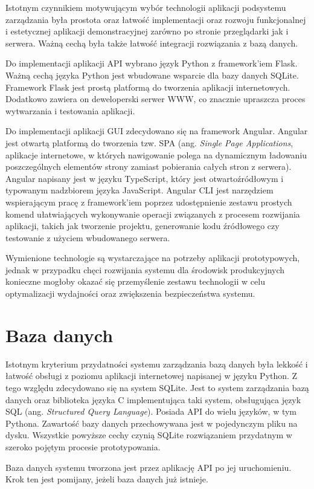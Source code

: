        	Istotnym czynnikiem motywującym wybór technologii aplikacji podsystemu zarządzania była prostota oraz łatwość implementacji oraz rozwoju funkcjonalnej i estetycznej aplikacji demonstracyjnej zarówno po stronie przeglądarki jak i serwera. Ważną cechą była także łatwość integracji rozwiązania z bazą danych. 

		Do implementacji aplikacji API wybrano język Python z framework'iem Flask. Ważną cechą języka Python jest wbudowane wsparcie dla bazy danych SQLite. Framework Flask jest prostą platformą do tworzenia aplikacji internetowych. Dodatkowo zawiera on deweloperski serwer WWW, co znacznie upraszcza proces wytwarzania i testowania aplikacji.

		Do implementacji aplikacji GUI zdecydowano się na framework Angular. Angular jest otwartą platformą do tworzenia tzw. SPA (ang. \textit{Single Page Applications}, aplikacje internetowe, w których nawigowanie polega na dynamicznym ładowaniu poszczególnych elementów strony zamiast pobierania całych stron z serwera). Angular napisany jest w języku TypeScript, który jest otwartoźródłowym i typowanym nadzbiorem języka JavaScript. Angular CLI jest narzędziem wspierającym pracę z framework'iem poprzez udostępnienie zestawu prostych komend ułatwiających wykonywanie operacji związanych z procesem rozwijania aplikacji, takich jak tworzenie projektu, generowanie kodu źródłowego czy testowanie z użyciem wbudowanego serwera.

		Wymienione technologie są wystarczające na potrzeby aplikacji prototypowych, jednak w przypadku chęci rozwijania systemu dla środowisk produkcyjnych konieczne mogłoby okazać się przemyślenie zestawu technologii w celu optymalizacji wydajności oraz zwiększenia bezpieczeństwa systemu.

    \section{Baza danych}

    	Istotnym kryterium przydatności systemu zarządzania bazą danych była lekkość i łatwość obsługi z poziomu aplikacji internetowej napisanej w języku Python. Z tego względu zdecydowano się na system SQLite. Jest to system zarządzania bazą danych oraz biblioteka języka C implementująca taki system, obsługująca język SQL (ang. \textit{Structured Query Language}). Posiada API do wielu języków, w tym Pythona. Zawartość bazy danych przechowywana jest w pojedynczym pliku na dysku. Wszystkie powyższe cechy czynią SQLite rozwiązaniem przydatnym w szeroko pojętym procesie prototypowania.

    	Baza danych systemu tworzona jest przez aplikację API po jej uruchomieniu. Krok ten jest pomijany, jeżeli baza danych już istnieje.